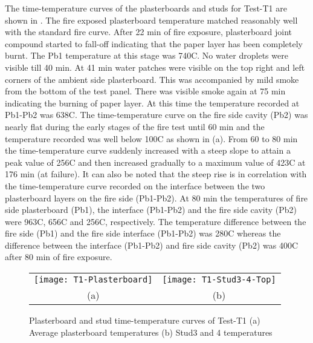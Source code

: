 The time-temperature curves of the plasterboards and studs for Test-T1 are shown in . The fire exposed plasterboard temperature matched reasonably well with the standard fire curve. After 22 min of fire exposure, plasterboard joint compound started to fall-off indicating that the paper layer has been completely burnt. The Pb1 temperature at this stage was 740\degree C. No water droplets were visible till 40 min. At 41 min water patches were visible on the top right and left corners of the ambient side plasterboard. This was accompanied by mild smoke from the bottom of the test panel. There was visible smoke again at 75 min indicating the burning of paper layer. At this time the temperature recorded at Pb1-Pb2 was 638\degree C. The time-temperature curve on the fire side cavity (Pb2) was nearly flat during the early stages of the fire test until 60 min and the temperature recorded was well below 100\degree C as shown in  (a). From 60 to 80 min the time-temperature curve suddenly increased with a steep slope to attain a peak value of 256\degree C and then increased gradually to a maximum value of 423\degree C at 176 min (at failure). It can also be noted that the steep rise is in correlation with the time-temperature curve recorded on the interface between the two plasterboard layers on the fire side (Pb1-Pb2). At 80 min the temperatures of fire side plasterboard (Pb1), the interface (Pb1-Pb2) and the fire side cavity (Pb2) were 963\degree C, 656\degree C and 256\degree C, respectively. The temperature difference between the fire side (Pb1) and the fire side interface (Pb1-Pb2) was 280\degree C whereas the difference between the interface (Pb1-Pb2) and fire side cavity (Pb2) was 400\degree C after 80 min of fire exposure. 
\begin{figure}[!htbp]
	\centering
		\begin{tabular}{cc}
			\texttt{[image: T1-Plasterboard]} & \texttt{[image: T1-Stud3-4-Top]} \\ 
			(a) & (b)  \\ 
		\end{tabular} 
		\caption{Plasterboard and stud time-temperature curves of Test-T1 (a) Average plasterboard temperatures (b) Stud3 and 4 temperatures}
		\label{fig:T1-PB-Stud}
\end{figure}

